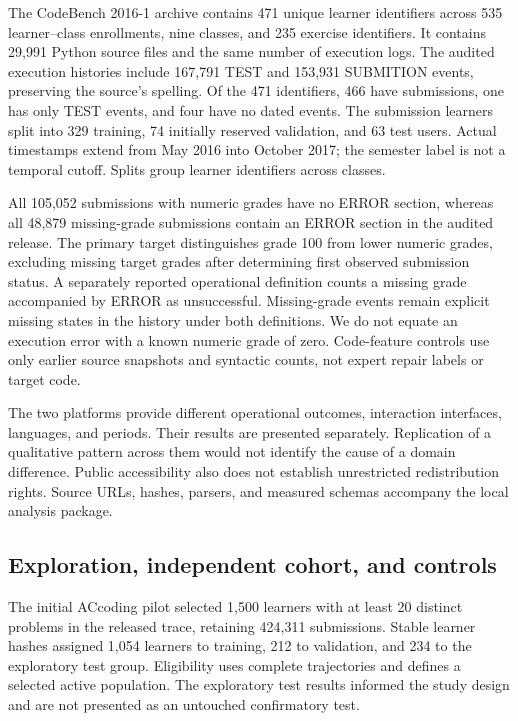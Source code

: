 \documentclass[11pt]{article}
\newcommand{\1}{\mathbb{I}}
\begin{document}
The CodeBench 2016-1 archive \cite{codebench} contains 471 unique learner identifiers across 535 learner--class enrollments, nine classes, and 235 exercise identifiers. It contains 29,991 Python source files and the same number of execution logs. The audited execution histories include 167,791 TEST and 153,931 SUBMITION events, preserving the source's spelling. Of the 471 identifiers, 466 have submissions, one has only TEST events, and four have no dated events. The submission learners split into 329 training, 74 initially reserved validation, and 63 test users. Actual timestamps extend from May 2016 into October 2017; the semester label is not a temporal cutoff. Splits group learner identifiers across classes.

All 105,052 submissions with numeric grades have no ERROR section, whereas all 48,879 missing-grade submissions contain an ERROR section in the audited release. The primary target distinguishes grade 100 from lower numeric grades, excluding missing target grades after determining first observed submission status. A separately reported operational definition counts a missing grade accompanied by ERROR as unsuccessful. Missing-grade events remain explicit missing states in the history under both definitions. We do not equate an execution error with a known numeric grade of zero. Code-feature controls use only earlier source snapshots and syntactic counts, not expert repair labels or target code.

The two platforms provide different operational outcomes, interaction interfaces, languages, and periods. Their results are presented separately. Replication of a qualitative pattern across them would not identify the cause of a domain difference. Public accessibility also does not establish unrestricted redistribution rights. Source URLs, hashes, parsers, and measured schemas accompany the local analysis package.

\subsection{Exploration, independent cohort, and controls}
The initial ACcoding pilot selected 1,500 learners with at least 20 distinct problems in the released trace, retaining 424,311 submissions. Stable learner hashes assigned 1,054 learners to training, 212 to validation, and 234 to the exploratory test group. Eligibility uses complete trajectories and defines a selected active population. The exploratory test results informed the study design and are not presented as an untouched confirmatory test.
\end{document}
